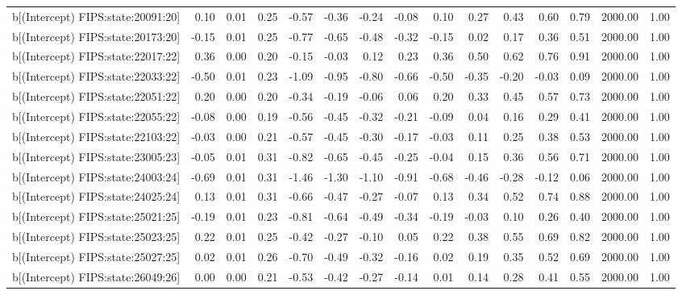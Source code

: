 \begin{table}[ht]
\begin{tabular}{rrrrrrrrrrrrrrr}
  b[(Intercept) FIPS:state:20091:20] & 0.10 & 0.01 & 0.25 & -0.57 & -0.36 & -0.24 & -0.08 & 0.10 & 0.27 & 0.43 & 0.60 & 0.79 & 2000.00 & 1.00 \\ 
  b[(Intercept) FIPS:state:20173:20] & -0.15 & 0.01 & 0.25 & -0.77 & -0.65 & -0.48 & -0.32 & -0.15 & 0.02 & 0.17 & 0.36 & 0.51 & 2000.00 & 1.00 \\ 
  b[(Intercept) FIPS:state:22017:22] & 0.36 & 0.00 & 0.20 & -0.15 & -0.03 & 0.12 & 0.23 & 0.36 & 0.50 & 0.62 & 0.76 & 0.91 & 2000.00 & 1.00 \\ 
  b[(Intercept) FIPS:state:22033:22] & -0.50 & 0.01 & 0.23 & -1.09 & -0.95 & -0.80 & -0.66 & -0.50 & -0.35 & -0.20 & -0.03 & 0.09 & 2000.00 & 1.00 \\ 
  b[(Intercept) FIPS:state:22051:22] & 0.20 & 0.00 & 0.20 & -0.34 & -0.19 & -0.06 & 0.06 & 0.20 & 0.33 & 0.45 & 0.57 & 0.73 & 2000.00 & 1.00 \\ 
  b[(Intercept) FIPS:state:22055:22] & -0.08 & 0.00 & 0.19 & -0.56 & -0.45 & -0.32 & -0.21 & -0.09 & 0.04 & 0.16 & 0.29 & 0.41 & 2000.00 & 1.00 \\ 
  b[(Intercept) FIPS:state:22103:22] & -0.03 & 0.00 & 0.21 & -0.57 & -0.45 & -0.30 & -0.17 & -0.03 & 0.11 & 0.25 & 0.38 & 0.53 & 2000.00 & 1.00 \\ 
  b[(Intercept) FIPS:state:23005:23] & -0.05 & 0.01 & 0.31 & -0.82 & -0.65 & -0.45 & -0.25 & -0.04 & 0.15 & 0.36 & 0.56 & 0.71 & 2000.00 & 1.00 \\ 
  b[(Intercept) FIPS:state:24003:24] & -0.69 & 0.01 & 0.31 & -1.46 & -1.30 & -1.10 & -0.91 & -0.68 & -0.46 & -0.28 & -0.12 & 0.06 & 2000.00 & 1.00 \\ 
  b[(Intercept) FIPS:state:24025:24] & 0.13 & 0.01 & 0.31 & -0.66 & -0.47 & -0.27 & -0.07 & 0.13 & 0.34 & 0.52 & 0.74 & 0.88 & 2000.00 & 1.00 \\ 
  b[(Intercept) FIPS:state:25021:25] & -0.19 & 0.01 & 0.23 & -0.81 & -0.64 & -0.49 & -0.34 & -0.19 & -0.03 & 0.10 & 0.26 & 0.40 & 2000.00 & 1.00 \\ 
  b[(Intercept) FIPS:state:25023:25] & 0.22 & 0.01 & 0.25 & -0.42 & -0.27 & -0.10 & 0.05 & 0.22 & 0.38 & 0.55 & 0.69 & 0.82 & 2000.00 & 1.00 \\ 
  b[(Intercept) FIPS:state:25027:25] & 0.02 & 0.01 & 0.26 & -0.70 & -0.49 & -0.32 & -0.16 & 0.02 & 0.19 & 0.35 & 0.52 & 0.69 & 2000.00 & 1.00 \\ 
  b[(Intercept) FIPS:state:26049:26] & 0.00 & 0.00 & 0.21 & -0.53 & -0.42 & -0.27 & -0.14 & 0.01 & 0.14 & 0.28 & 0.41 & 0.55 & 2000.00 & 1.00 \\ 

\end{tabular}
\end{table}
